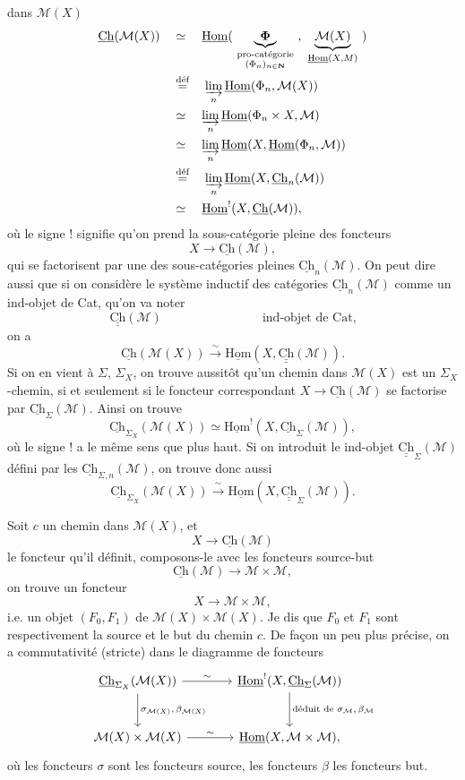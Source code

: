 \documentclass[11pt]{article}
\newcommand{\printedpage}[1]{\marginpar{\footnotesize p.~#1}}
\newcommand{\msp}[1]{\marginpar{\footnotesize [#1]}}
\newcommand{\cM}{\mathcal{M}}
\newcommand{\Ch}{\underline{\mathrm{Ch}}}
\newcommand{\Chh}{\underline{\underline{\mathrm{Ch}}}}
\newcommand{\dfeq}{\overset{\text{déf}}{=}}
\newcommand{\uHom}{\underline{\mathrm{Hom}}}
\begin{document}
\printedpage{19}

dans $\cM(X)$
\[
\begin{aligned}
\Ch(\cM(X)) \quad &\simeq \quad \uHom(\ \underbrace{\boldsymbol{\Phi}}_{\substack{\text{pro-catégorie}\\ (\Phi_n)_{n\in\mathbf{N}}}}\ ,\ \underbrace{\cM(X)}_{\uHom(X,M)}\ ) \\ %
&\dfeq \quad \varinjlim_n \uHom(\Phi_n,\cM(X)) \\
&\simeq \quad \varinjlim_n \uHom(\Phi_n\times X,\cM) \\
&\simeq \quad \varinjlim_n \uHom(X,\uHom(\Phi_n,\cM)) \\
&\dfeq \quad \varinjlim_n \uHom(X,\Ch_n(\cM)) \\
&\simeq \quad \uHom^{!}(X,\Ch(\cM)),
\end{aligned}
\]
où le signe ! signifie qu'on prend la sous-catégorie pleine des foncteurs
\[
X\longrightarrow \Ch(\cM),
\]
\msp{page 30}
qui se factorisent par une des sous-catégories pleines $\Ch_n(\cM)$. On peut dire aussi que si on considère le système inductif des catégories $\Ch_n(\cM)$ comme un ind-objet de Cat, qu'on va noter
\[
\Chh(\cM) \qquad\qquad\qquad\qquad \text{ind-objet de Cat,}
\]
on a
\[
\Ch(\cM(X)) \xrightarrow{\ \sim\ } \uHom(X,\Chh(\cM)).
\]
Si on en vient à $\Sigma$, $\Sigma_X$, on trouve aussitôt qu'un chemin dans $\cM(X)$ est un $\Sigma_X$-chemin, si et seulement si le foncteur correspondant $X\longrightarrow\Ch(\cM)$ se factorise par $\Ch_{\Sigma}(\cM)$. Ainsi on trouve
\[
\Ch_{\Sigma_X}(\cM(X))\simeq\uHom^{!}(X,\Ch_{\Sigma}(\cM)),
\]
où le signe ! a le même sens que plus haut. Si on introduit le ind-objet $\Chh_{\Sigma}(\cM)$ défini par les $\Ch_{\Sigma,n}(\cM)$, on trouve donc aussi
\[
\Ch_{\Sigma_X}(\cM(X))\xrightarrow{\ \sim\ }\uHom(X,\Chh_{\Sigma}(\cM)).
\]

\msp{page 31}
Soit $c$ un chemin dans $\cM(X)$, et
\[
X\longrightarrow\Ch(\cM)
\]
le foncteur qu'il définit, composons-le avec les foncteurs source-but
\[
\Ch(\cM)\longrightarrow\cM\times\cM,
\]
on trouve un foncteur
\[
X\longrightarrow\cM\times\cM,
\]
i.e. un objet $(F_0,F_1)$ de $\cM(X)\times\cM(X)$. Je dis que $F_0$ et $F_1$ sont respectivement la source et le but du chemin $c$. De façon un peu plus précise, on a commutativité (stricte) dans le diagramme de foncteurs
\printedpage{20}
\[
\begin{tikzcd}[column sep=large, row sep=large]
\Ch_{\Sigma_X}(\cM(X)) \arrow[r, "\sim"] \arrow[d, "{\sigma_{\cM(X)},\,\beta_{\cM(X)}}"] & \uHom^{!}(X,\Ch_{\Sigma}(\cM)) \arrow[d, "{\text{déduit de }\sigma_{\cM},\,\beta_{\cM}}"] \\
\cM(X)\times\cM(X) \arrow[r, "\sim"] & \uHom(X,\cM\times\cM),
\end{tikzcd}
\]
où les foncteurs $\sigma$ sont les foncteurs source, les foncteurs $\beta$ les foncteurs but.
\end{document}
